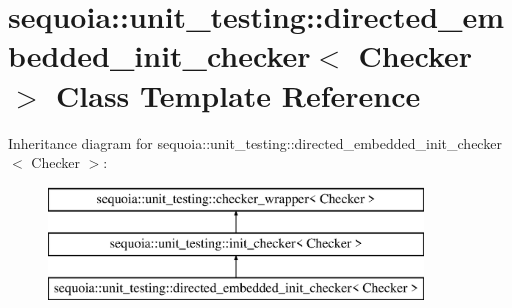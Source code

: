 \hypertarget{classsequoia_1_1unit__testing_1_1directed__embedded__init__checker}{}\section{sequoia\+::unit\+\_\+testing\+::directed\+\_\+embedded\+\_\+init\+\_\+checker$<$ Checker $>$ Class Template Reference}
\label{classsequoia_1_1unit__testing_1_1directed__embedded__init__checker}
Inheritance diagram for sequoia\+::unit\+\_\+testing\+::directed\+\_\+embedded\+\_\+init\+\_\+checker$<$ Checker $>$\+:\begin{figure}[H]
\begin{center}
\leavevmode
\includegraphics[height=3.000000cm]{classsequoia_1_1unit__testing_1_1directed__embedded__init__checker}
\end{center}
\end{figure}
